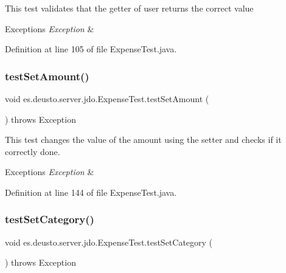 This test validates that the getter of user returns the correct value 
\begin{DoxyExceptions}{Exceptions}
{\em Exception} & \\
\hline
\end{DoxyExceptions}


Definition at line 105 of file Expense\+Test.\+java.

\mbox{\label{classes_1_1deusto_1_1server_1_1jdo_1_1_expense_test_a14edb47f18e79d658398ecba6defbb46}} 
\subsubsection{\texorpdfstring{test\+Set\+Amount()}{testSetAmount()}}
{\footnotesize\ttfamily void es.\+deusto.\+server.\+jdo.\+Expense\+Test.\+test\+Set\+Amount (\begin{DoxyParamCaption}{ }\end{DoxyParamCaption}) throws Exception}

This test changes the value of the amount using the setter and checks if it correctly done. 
\begin{DoxyExceptions}{Exceptions}
{\em Exception} & \\
\hline
\end{DoxyExceptions}


Definition at line 144 of file Expense\+Test.\+java.

\mbox{\label{classes_1_1deusto_1_1server_1_1jdo_1_1_expense_test_aa338c93917012381fe92904b764384b1}} 
\subsubsection{\texorpdfstring{test\+Set\+Category()}{testSetCategory()}}
{\footnotesize\ttfamily void es.\+deusto.\+server.\+jdo.\+Expense\+Test.\+test\+Set\+Category (\begin{DoxyParamCaption}{ }\end{DoxyParamCaption}) throws Exception}

